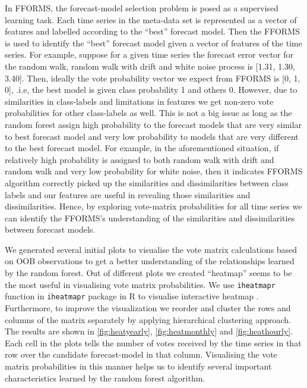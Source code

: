 \documentclass[11pt,a4paper,]{article}
\begin{document}
In FFORMS, the forecast-model selection problem is posed as a supervised learning task. Each time series in the meta-data set is represented as a vector of features and labelled according to the ``best'' forecast model. Then the FFORMS is used to identify the ``best'' forecast model given a vector of features of the time series. For example, suppose for a given time series the forecast error vector for the random walk, random walk with drift and white noise process is {[}1.31, 1.30, 3.40{]}. Then, ideally the vote probability vector we expect from FFORMS is {[}0, 1, 0{]}, .i.e, the best model is given class probability 1 and others 0. However, due to similarities in class-labels and limitations in features we get non-zero vote probabilities for other class-labels as well. This is not a big issue as long as the random forest assign high probability to the forecast models that are very similar to best forecast model and very low probability to models that are very different to the best forecast model. For example, in the aforementioned situation, if relatively high probability is assigned to both random walk with drift and random walk and very low probability for white noise, then it indicates FFORMS algorithm correctly picked up the similarities and dissimilarities between class labels and our features are useful in revealing those similarities and dissimilarities. Hence, by exploring vote-matrix probabilities for all time series we can identify the FFORMS's understanding of the similarities and dissimilarities between forecast models.

We generated several initial plots to visualise the vote matrix calculations based on OOB observations to get a better understanding of the relationships learned by the random forest. Out of different plots we created ``heatmap'' seems to be the most useful in visualising vote matrix probabilities. We use \texttt{iheatmapr} function in \texttt{iheatmapr} package in R to visualise interactive heatmap \autocite{iheatmapr}. Furthermore, to improve the visualization we reorder and cluster the rows and columns of the matrix separately by applying hierarchical clustering approach. The results are shown in \autoref{fig:heatyearly}, \autoref{fig:heatmonthly} and \autoref{fig:heathourly}. Each cell in the plots tells the number of votes received by the time series in that row over the candidate forecast-model in that column. Visualising the vote matrix probabilities in this manner helps us to identify several important characteristics learned by the random forest algorithm.
\end{document}
